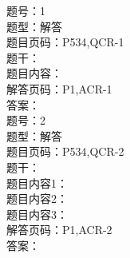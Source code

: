 \documentclass[11pt]{article}
\theoremstyle{definition}
\begin{document}
\begin{CJK*}{UTF8}{gbsn}
题号：1\\
题型：解答\\
题目页码：P534,QCR-1\\
题干：\\
题目内容：\\
解答页码：P1,ACR-1\\
答案：\\

题号：2\\
题型：解答\\
题目页码：P534,QCR-2\\
题干：\\
题目内容1：\\
题目内容2：\\
题目内容3：\\
解答页码：P1,ACR-2\\
答案：\\

\end{CJK*}
\end{document}
